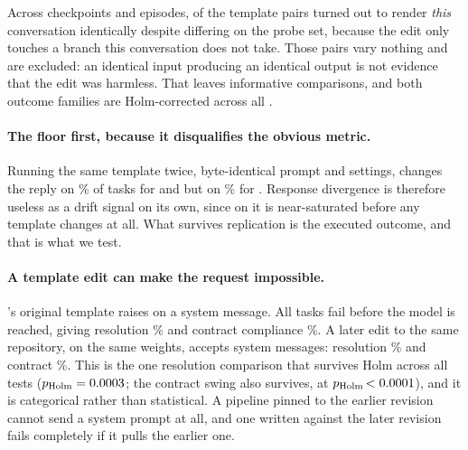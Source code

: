 Across \NCheckpoints{} checkpoints and \NExecEpisodes{} episodes, \NUninformative{} of the template
pairs turned out to render \emph{this} conversation identically despite differing on the probe set,
because the edit only touches a branch this conversation does not take. Those pairs vary nothing and
are excluded: an identical input producing an identical output is not evidence that the edit was
harmless. That leaves \NFamily{} informative comparisons, and both outcome families are
Holm-corrected across all \NFamily{}.

\paragraph{The floor first, because it disqualifies the obvious metric.} Running the same template
twice, byte-identical prompt and settings, changes the reply on \MinNoiseFloor\% of tasks for
\ShortMistral{} and \ShortPhi{} but on \MaxNoiseFloor\% for \ShortDS{}. Response divergence is
therefore useless as a drift signal on its own, since on \ShortDS{} it is near-saturated before any
template changes at all. What survives replication is the executed outcome, and that is what we test.

\paragraph{A template edit can make the request impossible.} \ShortMistral's original template
raises on a system message. All \MistralRenderErr{} tasks fail before the model is reached, giving
resolution \ResMistralA\% and contract compliance \ConMistralA\%. A later edit to the same
repository, on the same weights, accepts system messages: resolution \ResMistralB\% and contract
\ConMistralB\%. This is the one resolution comparison that survives Holm across all \NFamily{} tests
($p_{\text{Holm}}=0.0003$; the contract swing also survives, at
$p_{\text{Holm}}\,{<0.0001}$), and it is categorical rather than statistical. A pipeline
pinned to the earlier revision cannot send a system prompt at all, and one written against the later
revision fails completely if it pulls the earlier one.

